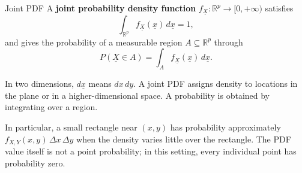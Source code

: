 \documentclass[a4paper,12pt,oneside]{report}
\begin{document}
\begin{frameddefn}{Joint PDF}
\label{def:joint-pdf}
A \textbf{joint probability density function}
$f_{\underline{X}}:\mathbb R^p\to[0,+\infty)$ satisfies
\[
  \int_{\mathbb R^p}f_{\underline{X}}(\underline{x})\,d\underline{x}=1,
\]
and gives the probability of a measurable region
$A\subseteq\mathbb R^p$ through
\[
  P(\underline{X}\in A)=\int_A f_{\underline{X}}(\underline{x})\,d\underline{x}.
\]
\end{frameddefn}

In two dimensions, $d\underline{x}$ means $dx\,dy$.
A joint PDF assigns density to locations in the plane or in a
higher-dimensional space. A probability is obtained by integrating
over a region.

In particular, a small rectangle near $(x,y)$ has probability approximately
$f_{X,Y}(x,y)\,\Delta x\,\Delta y$ when the density varies little
over the rectangle. The PDF value itself is not a point probability;
in this setting, every individual point has probability zero.
\end{document}
